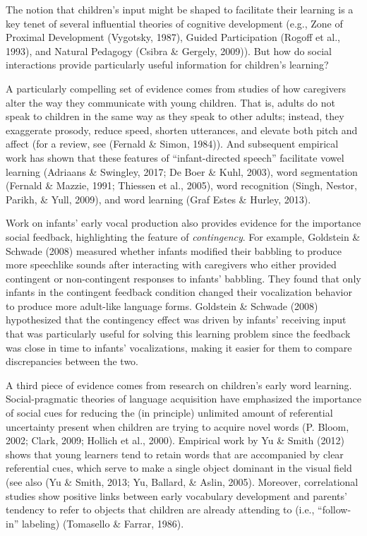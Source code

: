 \documentclass[a4paper,man,apacite,floatsintext]{apa6}
\begin{document}
The notion that children's input might be shaped to facilitate their
learning is a key tenet of several influential theories of cognitive
development (e.g., Zone of Proximal Development (Vygotsky, 1987), Guided
Participation (Rogoff et al., 1993), and Natural Pedagogy (Csibra \&
Gergely, 2009)). But how do social interactions provide particularly
useful information for children's learning?

A particularly compelling set of evidence comes from studies of how
caregivers alter the way they communicate with young children. That is,
adults do not speak to children in the same way as they speak to other
adults; instead, they exaggerate prosody, reduce speed, shorten
utterances, and elevate both pitch and affect (for a review, see
(Fernald \& Simon, 1984)). And subsequent empirical work has shown that
these features of ``infant-directed speech'' facilitate vowel learning
(Adriaans \& Swingley, 2017; De Boer \& Kuhl, 2003), word segmentation
(Fernald \& Mazzie, 1991; Thiessen et al., 2005), word recognition
(Singh, Nestor, Parikh, \& Yull, 2009), and word learning (Graf Estes \&
Hurley, 2013).

Work on infants' early vocal production also provides evidence for the
importance social feedback, highlighting the feature of
\emph{contingency}. For example, Goldstein \& Schwade (2008) measured
whether infants modified their babbling to produce more speechlike
sounds after interacting with caregivers who either provided contingent
or non-contingent responses to infants' babbling. They found that only
infants in the contingent feedback condition changed their vocalization
behavior to produce more adult-like language forms. Goldstein \& Schwade
(2008) hypothesized that the contingency effect was driven by infants'
receiving input that was particularly useful for solving this learning
problem since the feedback was close in time to infants' vocalizations,
making it easier for them to compare discrepancies between the two.

A third piece of evidence comes from research on children's early word
learning. Social-pragmatic theories of language acquisition have
emphasized the importance of social cues for reducing the (in principle)
unlimited amount of referential uncertainty present when children are
trying to acquire novel words (P. Bloom, 2002; Clark, 2009; Hollich et
al., 2000). Empirical work by Yu \& Smith (2012) shows that young
learners tend to retain words that are accompanied by clear referential
cues, which serve to make a single object dominant in the visual field
(see also (Yu \& Smith, 2013; Yu, Ballard, \& Aslin, 2005). Moreover,
correlational studies show positive links between early vocabulary
development and parents' tendency to refer to objects that children are
already attending to (i.e., ``follow-in'' labeling) (Tomasello \&
Farrar, 1986).
\end{document}
